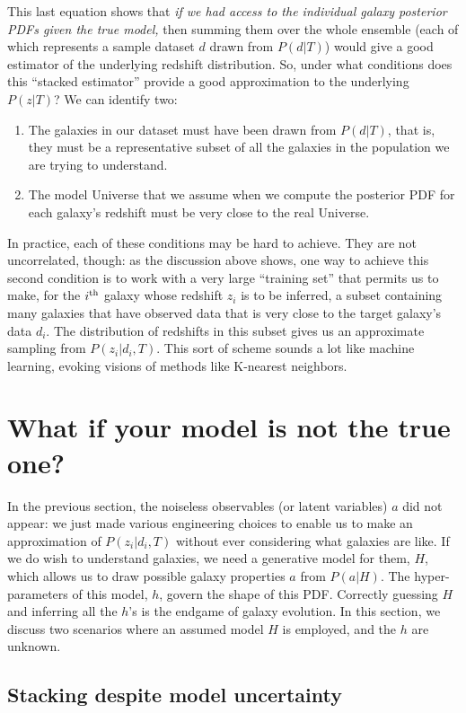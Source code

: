 \documentclass[11pt]{amsart}
\begin{document}
This last equation shows that {\it if we had access to the individual
galaxy posterior PDFs given the true model,} then summing them over the
whole ensemble (each of which represents a sample dataset $d$ drawn from
$P(d|T)$) would give a good estimator of the underlying redshift
distribution. So, under what conditions does this ``stacked estimator''
provide a good approximation to the underlying $P(z|T)$? We can identify
two:
\begin{enumerate}
\item The galaxies in our dataset must have been drawn from $P(d|T)$, that is, they must be a representative subset of all the galaxies in the population we are trying to understand.
\item The model Universe that we assume when we compute the posterior PDF for each galaxy's redshift must be very close to the real Universe.
\end{enumerate}
In practice, each of these conditions may be hard to achieve.
They are not uncorrelated, though:
as the discussion above shows, one way to achieve this second condition
is to work with a very large ``training set'' that permits us to make,
for the $i^{\rm th}$ galaxy whose redshift $z_i$ is to be inferred, a
subset  containing many galaxies that have observed data that is very
close to the target galaxy's data $d_i$. The distribution of redshifts
in this subset gives us an approximate sampling from $P(z_i|d_i,T)$.
This sort of scheme sounds a lot like machine learning, evoking visions
of methods like K-nearest neighbors.


\section{What if your model is not the true one?}

In the previous section, the noiseless observables (or latent variables) $a$ did not appear: we just made various engineering choices to enable us to make an approximation of $P(z_i|d_i,T)$ without ever considering what galaxies are like. If we do wish to understand galaxies, we need a generative model for them, $H$, which allows us to draw possible galaxy properties $a$ from $P(a|H)$. The hyper-parameters of this model, $h$, govern the shape of this PDF. Correctly guessing $H$ and inferring all the $h$'s is the endgame of galaxy evolution. In this section, we discuss two scenarios where an assumed model $H$ is employed, and the $h$ are unknown.


\subsection{Stacking despite model uncertainty}
\end{document}
